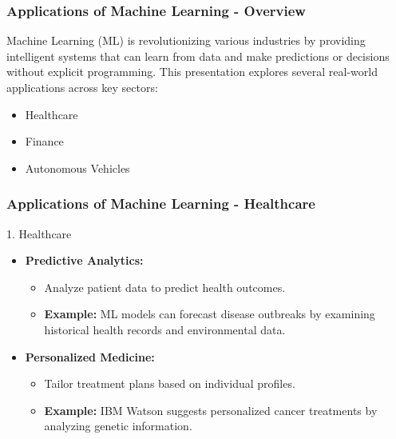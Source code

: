 \documentclass[aspectratio=169]{beamer}
\begin{document}
\begin{frame}[fragile]
    \frametitle{Applications of Machine Learning - Overview}
    Machine Learning (ML) is revolutionizing various industries by providing intelligent systems that can learn from data and make predictions or decisions without explicit programming. 
    This presentation explores several real-world applications across key sectors:
    \begin{itemize}
        \item Healthcare
        \item Finance
        \item Autonomous Vehicles
    \end{itemize}
\end{frame}

\begin{frame}[fragile]
    \frametitle{Applications of Machine Learning - Healthcare}
    \begin{block}{1. Healthcare}
        \begin{itemize}
            \item \textbf{Predictive Analytics:}
            \begin{itemize}
                \item Analyze patient data to predict health outcomes.
                \item \textbf{Example:} ML models can forecast disease outbreaks by examining historical health records and environmental data.
            \end{itemize}
            
            \item \textbf{Personalized Medicine:}
            \begin{itemize}
                \item Tailor treatment plans based on individual profiles.
                \item \textbf{Example:} IBM Watson suggests personalized cancer treatments by analyzing genetic information.
            \end{itemize}
        \end{itemize}
    \end{block}
\end{frame}
\end{document}
